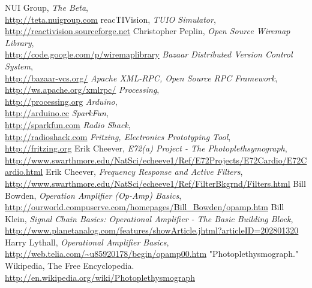 \begin{thebibliography}{99}%
NUI Group, \textsl{The Beta},
\\ \mbox{}\hfill\url{http://teta.nuigroup.com}
reacTIVision, \textsl{TUIO Simulator},
\\ \mbox{}\hfill\url{http://reactivision.sourceforge.net}
Christopher Peplin, \textsl{Open Source Wiremap Library},
\\ \mbox{}\hfill\url{http://code.google.com/p/wiremaplibrary}
\textsl{Bazaar Distributed Version Control System},
\\ \mbox{}\hfill\url{http://bazaar-vcs.org/}
\textsl{Apache XML-RPC, Open Source RPC Framework},
\\ \mbox{}\hfill\url{http://ws.apache.org/xmlrpc/}
\textsl{Processing}, 
\\ \mbox{}\hfill\url{http://processing.org}
\textsl{Arduino},
\\ \mbox{}\hfill\url{http://arduino.cc}
\textsl{SparkFun},
\\ \mbox{}\hfill\url{http://sparkfun.com}
\textsl{Radio Shack},
\\ \mbox{}\hfill\url{http://radioshack.com}
\textsl{Fritzing, Electronics Prototyping Tool},
\\ \mbox{}\hfill\url{http://fritzing.org}
Erik Cheever, \textsl{E72(a) Project - The Photoplethsymograph},
\\ \mbox{}\hfill\url{http://www.swarthmore.edu/NatSci/echeeve1/Ref/E72Projects/E72Cardio/E72Cardio.html}
Erik Cheever, \textsl{Frequency Response and Active Filters},
\\ \mbox{}\hfill\url{http://www.swarthmore.edu/NatSci/echeeve1/Ref/FilterBkgrnd/Filters.html}
Bill Bowden, \textsl{Operation Amplifier (Op-Amp) Basics},
\\ \mbox{}\hfill\url{http://ourworld.compuserve.com/homepages/Bill\_Bowden/opamp.htm}
Bill Klein, \textsl{Signal Chain Basics: Operational Amplifier - The Basic Building Block},
\\ \mbox{}\hfill\url{http://www.planetanalog.com/features/showArticle.jhtml?articleID=202801320}
Harry Lythall, \textsl{Operational Amplifier Basics},
\\ \mbox{}\hfill\url{http://web.telia.com/~u85920178/begin/opamp00.htm}
"Photoplethysmograph." Wikipedia, The Free Encyclopedia.
\\ \mbox{}\hfill\url{http://en.wikipedia.org/wiki/Photoplethysmograph}
\end{thebibliography}
